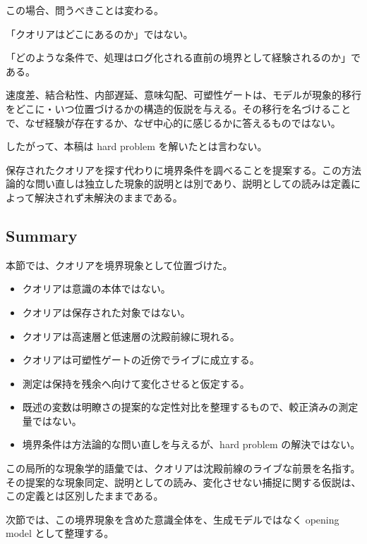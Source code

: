 この場合、問うべきことは変わる。

「クオリアはどこにあるのか」ではない。

「どのような条件で、処理はログ化される直前の境界として経験されるのか」である。

速度差、結合粘性、内部遅延、意味勾配、可塑性ゲートは、モデルが現象的移行をどこに・いつ位置づけるかの構造的仮説を与える。その移行を名づけることで、なぜ経験が存在するか、なぜ中心的に感じるかに答えるものではない。

したがって、本稿は hard problem を解いたとは言わない。

保存されたクオリアを探す代わりに境界条件を調べることを提案する。この方法論的な問い直しは独立した現象的説明とは別であり、説明としての読みは定義によって解決されず未解決のままである。

\subsection{Summary}

本節では、クオリアを境界現象として位置づけた。

\begin{itemize}
\item クオリアは意識の本体ではない。
\item クオリアは保存された対象ではない。
\item クオリアは高速層と低速層の沈殿前線に現れる。
\item クオリアは可塑性ゲートの近傍でライブに成立する。
\item 測定は保持を残余へ向けて変化させると仮定する。
\item 既述の変数は明瞭さの提案的な定性対比を整理するもので、較正済みの測定量ではない。
\item 境界条件は方法論的な問い直しを与えるが、hard problem の解決ではない。
\end{itemize}

この局所的な現象学的語彙では、クオリアは沈殿前線のライブな前景を名指す。その提案的な現象同定、説明としての読み、変化させない捕捉に関する仮説は、この定義とは区別したままである。

次節では、この境界現象を含めた意識全体を、生成モデルではなく opening model として整理する。
